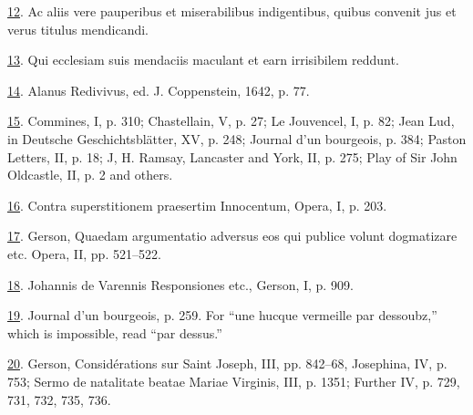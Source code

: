 \protect\hypertarget{23_NOTES.xhtmlux5cux23id_1248}{\protect\hyperlink{13_Chapter_Six__THE_DEPICTION_OF_TH.xhtmlux5cux23id_1247}{12}}.
Ac aliis vere pauperibus et miserabilibus indigentibus, quibus convenit
jus et verus titulus mendicandi.

\protect\hypertarget{23_NOTES.xhtmlux5cux23id_1246}{\protect\hyperlink{13_Chapter_Six__THE_DEPICTION_OF_TH.xhtmlux5cux23id_1245}{13}}.
Qui ecclesiam suis mendaciis maculant et earn irrisibilem reddunt.

\protect\hypertarget{23_NOTES.xhtmlux5cux23id_1244}{\protect\hyperlink{13_Chapter_Six__THE_DEPICTION_OF_TH.xhtmlux5cux23id_1243}{14}}.
Alanus Redivivus, ed. J. Coppenstein, 1642, p. 77.

\protect\hypertarget{23_NOTES.xhtmlux5cux23id_1242}{\protect\hyperlink{13_Chapter_Six__THE_DEPICTION_OF_TH.xhtmlux5cux23id_1241}{15}}.
Commines, I, p. 310; Chastellain, V, p. 27; Le Jouvencel, I, p. 82; Jean
Lud, in Deutsche Geschichtsblätter, XV, p. 248; Journal d'un bourgeois,
p. 384; Paston Letters, II, p. 18; J, H. Ramsay, Lancaster and York, II,
p. 275; Play of Sir John Oldcastle, II, p. 2 and others.

\protect\hypertarget{23_NOTES.xhtmlux5cux23id_1240}{\protect\hyperlink{13_Chapter_Six__THE_DEPICTION_OF_TH.xhtmlux5cux23id_1239}{16}}.
Contra superstitionem praesertim Innocentum, Opera, I, p. 203.

\protect\hypertarget{23_NOTES.xhtmlux5cux23id_1238}{\protect\hyperlink{13_Chapter_Six__THE_DEPICTION_OF_TH.xhtmlux5cux23id_1237}{17}}.
Gerson, Quaedam argumentatio adversus eos qui publice volunt dogmatizare
etc. Opera, II, pp. 521--522.

\protect\hypertarget{23_NOTES.xhtmlux5cux23id_1236}{\protect\hyperlink{13_Chapter_Six__THE_DEPICTION_OF_TH.xhtmlux5cux23id_1235}{18}}.
Johannis de Varennis Responsiones etc., Gerson, I, p. 909.

\protect\hypertarget{23_NOTES.xhtmlux5cux23id_1234}{\protect\hyperlink{13_Chapter_Six__THE_DEPICTION_OF_TH.xhtmlux5cux23id_1233}{19}}.
Journal d'un bourgeois, p. 259. For ``une hucque vermeille par
dessoubz,'' which is impossible, read ``par dessus.''

\protect\hypertarget{23_NOTES.xhtmlux5cux23id_1232}{\protect\hyperlink{13_Chapter_Six__THE_DEPICTION_OF_TH.xhtmlux5cux23id_1231}{20}}.
Gerson, Considérations sur Saint Joseph, III, pp. 842--68, Josephina,
IV, \protect\hypertarget{23_NOTES.xhtmlux5cux23page_417}{}{}p. 753;
Sermo de natalitate beatae Mariae Virginis, III, p. 1351; Further IV, p.
729, 731, 732, 735, 736.

